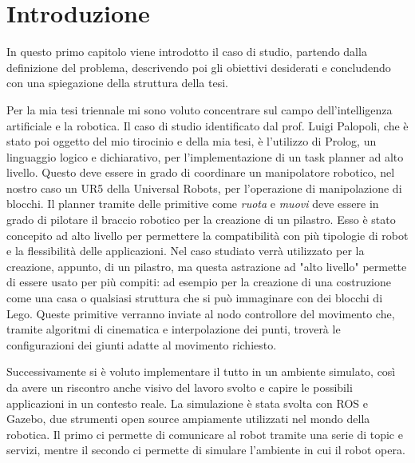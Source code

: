 \chapter{Introduzione}
\label{cha:intro}


In questo primo capitolo viene introdotto il caso di studio, partendo dalla definizione del problema, descrivendo poi gli obiettivi desiderati
e concludendo con una spiegazione della struttura della tesi.

Per la mia tesi triennale mi sono voluto concentrare sul campo dell'intelligenza artificiale e la robotica. Il caso di studio identificato
dal prof. Luigi Palopoli, che è stato poi oggetto del mio tirocinio e della mia tesi, è l'utilizzo di Prolog, un linguaggio logico e dichiarativo, per l'implementazione di un task planner ad alto livello.
Questo deve essere in grado di coordinare un manipolatore robotico, nel nostro caso un UR5 della Universal Robots, per l'operazione di manipolazione di blocchi.
Il planner tramite delle primitive come \textit{ruota} e \textit{muovi} deve essere in grado di pilotare il braccio robotico per la
creazione di un pilastro. Esso è stato concepito ad alto livello per permettere la compatibilità con più tipologie di robot e la flessibilità
delle applicazioni. Nel caso studiato verrà utilizzato per la creazione, appunto, di un pilastro, ma questa astrazione ad
"alto livello" permette di essere usato per più compiti: ad esempio per la creazione di una costruzione come una casa o qualsiasi struttura
che si può immaginare con dei blocchi di Lego. Queste primitive verranno inviate al nodo controllore del movimento che, tramite algoritmi di cinematica e
interpolazione dei punti, troverà le configurazioni dei giunti adatte al movimento richiesto. 

Successivamente si è voluto implementare il tutto in un
ambiente simulato, così da avere un riscontro anche visivo del lavoro svolto e capire le possibili applicazioni in un contesto reale.
La simulazione è stata svolta con ROS e Gazebo, due strumenti open source ampiamente utilizzati nel mondo della robotica. Il primo ci permette di
comunicare al robot tramite una serie di topic e servizi, mentre il secondo ci permette di simulare l'ambiente in cui il robot opera.

